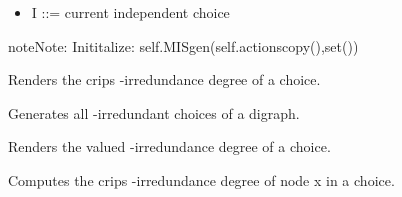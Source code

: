 \documentclass[letterpaper,10pt,english]{sphinxmanual}
\begin{document}
\begin{fulllineitems}
\begin{fulllineitems}
\begin{description}
\begin{itemize}
\item {} 
I ::= current independent choice

\end{itemize}

\end{description}

\begin{notice}{note}{Note:}
Inititalize: self.MISgen(self.actionscopy(),set())
\end{notice}

\end{fulllineitems}


\begin{fulllineitems}
\label{techDoc:digraphs.Digraph.absirred}
Renders the crips -irredundance degree of a choice.

\end{fulllineitems}


\begin{fulllineitems}
\label{techDoc:digraphs.Digraph.absirredundant}
Generates all -irredundant choices of a digraph.

\end{fulllineitems}


\begin{fulllineitems}
\label{techDoc:digraphs.Digraph.absirredval}
Renders the valued -irredundance degree of a choice.

\end{fulllineitems}


\begin{fulllineitems}
\label{techDoc:digraphs.Digraph.absirredx}
Computes the crips -irredundance degree of node x in a choice.

\end{fulllineitems}



\end{fulllineitems}
\end{document}
